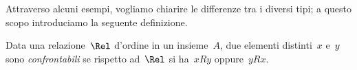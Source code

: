Attraverso alcuni esempi, vogliamo chiarire le differenze tra i diversi tipi; a 
questo scopo introduciamo la seguente definizione.

\begin{definizione}
Data una relazione~$\Rel$ d'ordine in un insieme~$A$, due elementi distinti~$x$ 
e~$y$ sono \emph{confrontabili} se rispetto ad~$\Rel$ si ha~$x R y$ oppure~$y R 
x$.
\end{definizione}

\begin{comment}
 
\begin{exrig}
 \begin{esempio}

In base al diagramma di Eulero-Venn nella figura~\ref{fig:B.5} introduciamo 
nell'insieme di insiemi~$S = \lbrace U, A, B, C, D, E, F \rbrace$ la 
relazione~$\Rel$: ``essere sottoinsieme di''.

Ricordiamo che, dati due insiemi~$X$ e~$Y$, $X$ è \emph{sottoinsieme} di~$Y$ 
quando ogni elemento di~$X$ appartiene a~$Y$ in simboli~$X \subseteq Y$ e
si legge~$X$ è contenuto in~$Y$ o~$X$ è uguale a~$Y$.

Vogliamo studiare le proprietà della relazione~$\Rel$:

\begin{enumeratea}
\item poiché ogni insieme è sottoinsieme di se stesso, possiamo dire che~$\Rel$ 
è riflessiva;
\item se~$X \subseteq Y$ e~$X \neq Y$ allora~$Y \not\subset X$ quindi~$\Rel$ è 
una relazione antisimmetrica;
\item se~$X \subseteq Y$ e~$Y \subseteq Z$ allora~$X \subseteq Z$ quindi~$\Rel$ 
è una relazione transitiva.
\end{enumeratea}

Inoltre è evidente che esistono almeno due elementi dell'insieme~$S$ che non 
sono in
alcun modo in relazione: ad esempio~$A \not\subset D$ e~$D \not\subset A$, 
ossia~$A$ e~$D$ non sono confrontabili.

 \end{esempio}

 \begin{esempio}

Riprendiamo il diagramma di Eulero-Venn dell'esempio precedente e introduciamo 
nell'insieme~$S = \lbrace U, A, B, C, D, E, F \rbrace$ la relazione~$\Rel$:
``essere sottoinsieme proprio di''. Studiamo le proprietà di questa relazione:
\begin{itemize*}
 \item cosa è cambiato rispetto alla relazione precedente? $\ldots$
 \item sono ancora valide le proprietà antisimmetrica e transitiva? $\ldots$
 \item esistono elementi di~$S$ non confrontabili? $\ldots$
\end{itemize*}


\end{comment}
